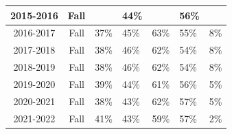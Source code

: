 \documentclass[10pt]{article}
\begin{document}
\begin{longtable}[c]{|c|c|ll|ll|r|}
	2015-2016                                                     & Fall                                                & \multicolumn{1}{l|}{}                     & 44\%                                     & \multicolumn{1}{l|}{}                     & 56\%                                     &                                                                                          \\ \hline
	2016-2017                                                     & Fall                                                & \multicolumn{1}{l|}{37\%}                 & 45\%                                     & \multicolumn{1}{l|}{63\%}                 & 55\%                                     & 8\%                                                                                      \\ \hline
	2017-2018                                                     & Fall                                                & \multicolumn{1}{l|}{38\%}                 & 46\%                                     & \multicolumn{1}{l|}{62\%}                 & 54\%                                     & 8\%                                                                                      \\ \hline
	2018-2019                                                     & Fall                                                & \multicolumn{1}{l|}{38\%}                 & 46\%                                     & \multicolumn{1}{l|}{62\%}                 & 54\%                                     & 8\%                                                                                      \\ \hline
	2019-2020                                                     & Fall                                                & \multicolumn{1}{l|}{39\%}                 & 44\%                                     & \multicolumn{1}{l|}{61\%}                 & 56\%                                     & 5\%                                                                                      \\ \hline
	2020-2021                                                     & Fall                                                & \multicolumn{1}{l|}{38\%}                 & 43\%                                     & \multicolumn{1}{l|}{62\%}                 & 57\%                                     & 5\%                                                                                      \\ \hline
	2021-2022                                                     & Fall                                                & \multicolumn{1}{l|}{41\%}                 & 43\%                                     & \multicolumn{1}{l|}{59\%}                 & 57\%                                     & 2\%                                                                                      \\ \hline
\end{longtable}
\end{document}
